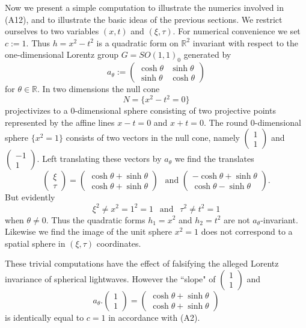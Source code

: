 \documentclass[12pt]{article}
\newcommand{\bR}{\mathbb{R}}
\begin{document}
Now we present a simple computation to illustrate the numerics involved in (A12), and to illustrate the basic ideas of the previous sections. We restrict ourselves to two variables $(x,t)$ and $(\xi, \tau)$. For numerical convenience we set $c:=1$. Thus $h=x^2-t^2$ is a quadratic form on $\bR^2$ invariant with respect to the one-dimensional Lorentz group $G=SO(1,1)_0$ generated by $$a_\theta:=\begin{pmatrix} \cosh \theta & \sinh \theta \\
\sinh \theta & \cosh \theta
\end{pmatrix}$$ for $\theta\in \bR$. In two dimensions the null cone $$N=\{x^2-t^2=0\}$$ projectivizes to a $0$-dimensional sphere consisting of two projective points represented by the affine lines $x-t=0$ and $x+t=0$. The round $0$-dimensional sphere $\{x^2=1\}$ consists of two vectors in the null cone, namely $\begin{pmatrix} 1 \\ 1\end{pmatrix}$ and $\begin{pmatrix} -1 \\ 1\end{pmatrix}.$ Left translating these vectors by $a_\theta$ we find the translates $$\begin{pmatrix} \xi \\ \tau \end{pmatrix}=\begin{pmatrix} \cosh \theta+\sinh \theta \\ \cosh \theta+\sinh \theta \end{pmatrix}~~\text{~and~} \begin{pmatrix} -\cosh \theta+\sinh \theta \\ \cosh \theta-\sinh \theta \end{pmatrix}.$$ But evidently $$\xi^2 \neq x^2=1^2=1 ~~\text{~and~}~~ \tau^2 \neq t^2=1$$ when $\theta\neq 0$. Thus the quadratic forms $h_1=x^2$ and $h_2=t^2$ are not $a_\theta$-invariant. Likewise we find the image of the unit sphere $x^2=1$ does not correspond to a spatial sphere in $(\xi, \tau)$ coordinates. 

These trivial computations have the effect of falsifying the alleged Lorentz invariance of spherical lightwaves. However the ``slope" of $\begin{pmatrix} 1 \\ 1\end{pmatrix}$ and $$a_\theta.\begin{pmatrix} 1 \\ 1\end{pmatrix}=\begin{pmatrix} \cosh \theta+\sinh \theta \\ \cosh \theta+\sinh \theta \end{pmatrix}$$ is identically equal to $c=1$ in accordance with (A2).
\end{document}
